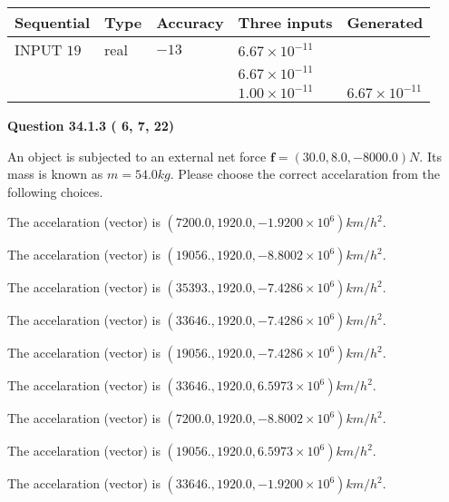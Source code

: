 \documentclass[12pt]{article}
\begin{document}
   
  
  
\noindent\begin{tabular}{|l|l|l|l|l|}
\hline
 Sequential & Type & Accuracy & Three inputs & Generated \\ 
\hline
 
 
  INPUT $          19$ & real & $         -13 $ & $
 6.67 \times 10^{-11}
  $ & \\
  & & &  $
 6.67 \times 10^{-11}
  $ & \\
  & & &  $
 1.00 \times 10^{-11}
 $ & $ 6.67 \times 10^{-11} $ 
 \\  \hline  
 \end{tabular}
   
   
  
\vspace{0.2in}
  
{\textbf{\Large{Question
34.1.3 
 (          6,          7,         22)
}}}
  
  
 
An object is subjected to an external net force $\mathbf{f}=(
30.0 ,
8.0,
-8000.0  )N$. Its mass is known as
$m= %
54.0  kg$. Please choose the correct accelaration
from the following choices.
 
 
 
The accelaration (vector) is
$(
7200.0,
1920.0 ,
-1.9200 \times 10^{6}
)km/h^2.
$
 
 
The accelaration (vector) is
$(
19056.,
1920.0 ,
-8.8002 \times 10^{6}
)km/h^2.
$
 
 
The accelaration (vector) is
$(
35393.,
1920.0 ,
-7.4286 \times 10^{6}
)km/h^2.
$
 
 
The accelaration (vector) is
$(
33646.,
1920.0 ,
-7.4286 \times 10^{6}
)km/h^2.
$
 
 
The accelaration (vector) is
$(
19056.,
1920.0 ,
-7.4286 \times 10^{6}
)km/h^2.
$
 
 
The accelaration (vector) is
$(
33646.,
1920.0 ,
6.5973 \times 10^{6}
)km/h^2.
$
 
 
The accelaration (vector) is
$(
7200.0,
1920.0 ,
-8.8002 \times 10^{6}
)km/h^2.
$
 
 
The accelaration (vector) is
$(
19056.,
1920.0 ,
6.5973 \times 10^{6}
)km/h^2.
$
 
 
The accelaration (vector) is
$(
33646.,
1920.0 ,
-1.9200 \times 10^{6}
)km/h^2.
$
 
\end{document}
